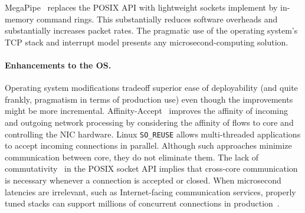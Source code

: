 MegaPipe~\cite{han2012megapipe} replaces the POSIX API with
lightweight sockets implement by in-memory command rings.  This
substantially reduces software overheads and substantially increases
packet rates.  The pragmatic use of the operating system's TCP stack
and interrupt model presents any microsecond-computing solution.

\paragraph{Enhancements to the OS.}

Operating system modifications tradeoff superior ease of deployability
(and quite frankly, pragmatism in terms of production use) even though
the improvements might be more incremental.
Affinity-Accept~\cite{DBLP:conf/eurosys/PesterevSZM12} improves the
affinity of incoming and outgoing network processing by considering
the affinity of flows to core and controlling the NIC hardware.  Linux
\texttt{SO\_REUSE} allows multi-threaded applications to accept
incoming connections in parallel.  Although such approaches minimize
communication between core, they do not eliminate them.  The lack of
commutativity~\cite{DBLP:conf/sosp/ClementsKZMK13} in the POSIX socket
API implies that cross-core communication is necessary whenever a
connection is accepted or closed.  When microsecond latencies are
irrelevant, such as Internet-facing communication services, properly
tuned stacks can support millions of concurrent connections in
production~\cite{whatsapp-2mil}.  
